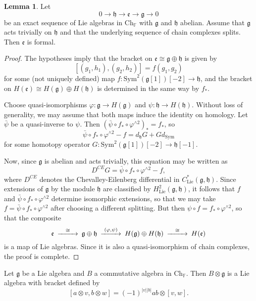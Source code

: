 \documentclass{compositio}
\theoremstyle{definition}\newtheorem{definition}{Definition}[section]
\theoremstyle{theorem}\newtheorem{lemma}[definition]{Lemma}
\theoremstyle{remark}\newtheorem*{conventions}{Conventions}
\theoremstyle{remark}\newtheorem*{acknowledgments}{Acknowledgments}
\theoremstyle{remark}\newtheorem*{outline}{Outline}
\theoremstyle{remark}\newtheorem*{questions}{Questions}
\theoremstyle{remark}\newtheorem{example}[definition]{Example}
\theoremstyle{definition}\newtheorem{construction}[definition]{Construction}
\theoremstyle{definition}\newtheorem*{convention}{Convention}
\theoremstyle{definition}\newtheorem*{conjecture}{Conjecture}
\theoremstyle{theorem}\newtheorem{theorem}[definition]{Theorem}
\theoremstyle{theorem}\newtheorem{paradigm}[definition]{Paradigm}
\theoremstyle{remark}\newtheorem{remark}[definition]{Remark}
\theoremstyle{corollary}\newtheorem{corollary}[definition]{Corollary}
\theoremstyle{theorem}\newtheorem{proposition}[definition]{Proposition}
\theoremstyle{definition}\newtheorem{question}[definition]{Question}
\begin{document}
\begin{lemma}
Let $$0\to\mathfrak{h}\to\mathfrak{e}\to\mathfrak{g}\to0$$ be an exact sequence of Lie algebras in ${\mathrm{Ch}}_\mathbb{F}$ with $\mathfrak{g}$ and $\mathfrak{h}$ abelian. Assume that $\mathfrak{g}$ acts trivially on $\mathfrak{h}$ and that the underlying sequence of chain complexes splits. Then $\mathfrak{e}$ is formal.
\end{lemma}
\begin{proof}
The hypotheses imply that the bracket on $\mathfrak{e}\cong\mathfrak{g}\oplus\mathfrak{h}$ is given by $$[(g_1,h_1),(g_2,h_2)]=f(g_1,g_2)$$ for some (not uniquely defined) map $f:{\mathrm{Sym}}^2(\mathfrak{g}[1])[-2]\to\mathfrak{h}$, and the bracket on $H(\mathfrak{e})\cong H(\mathfrak{g})\oplus H(\mathfrak{h})$ is determined in the same way by $f_*$.

Choose quasi-isomorphisms $\varphi:\mathfrak{g}\to H(\mathfrak{g})$ and $\psi:\mathfrak{h}\to H(\mathfrak{h})$. Without loss of generality, we may assume that both maps induce the identity on homology. Let $\bar\psi$ be a quasi-inverse to $\psi$. Then $(\bar\psi\circ f_*\circ\varphi^{\wedge2})_*=f_*$, so $$\bar\psi\circ f_*\circ\varphi^{\wedge 2}-f=d_{\mathfrak{h}}G+Gd_{\mathrm{Sym}}$$ for some homotopy operator $G:{\mathrm{Sym}}^2(\mathfrak{g}[1])[-2]\to \mathfrak{h}[-1]$. 

Now, since $\mathfrak{g}$ is abelian and acts trivially, this equation may be written as $$D^{CE}G=\bar\psi\circ f_*\circ\varphi^{\wedge 2}-f,$$ where $D^{CE}$ denotes the Chevalley-Eilenberg differential in $C^*_\mathrm{Lie}(\mathfrak{g},\mathfrak{h})$. Since extensions of $\mathfrak{g}$ by the module $\mathfrak{h}$ are classified by $H^2_\mathrm{Lie}(\mathfrak{g},\mathfrak{h})$, it follows that $f$ and $\bar\psi\circ f_*\circ\varphi^{\wedge2}$ determine isomorphic extensions, so that we may take $f=\bar\psi\circ f_*\circ\varphi^{\wedge 2}$ after choosing a different splitting. But then $\psi\circ f=f_*\circ \varphi^{\wedge 2}$, so that the composite $$\begin{CD}
\mathfrak{e}@>\cong>>\mathfrak{g}\oplus\mathfrak{h}@>(\varphi,\psi)>>H(\mathfrak{g})\oplus H(\mathfrak{h})@>\cong>>H(\mathfrak{e})
\end{CD}$$ is a map of Lie algebras. Since it is also a quasi-isomorphism of chain complexes, the proof is complete.
\end{proof}

Let $\mathfrak{g}$ be a Lie algebra and $B$ a commutative algebra in ${\mathrm{Ch}}_\mathbb{F}$. Then $B\otimes\mathfrak{g}$ is a Lie algebra with bracket defined by $$[a \otimes v, b\otimes w]=(-1)^{|v||b|}ab\otimes [v,w].$$
\end{document}
